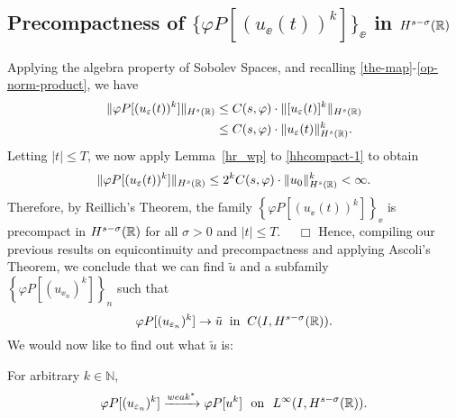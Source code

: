 \subsection{Precompactness of $\{\varphi P [(u_\ee(t))^k]\}_\ee$ in
$H^{s-\sigma  }(\mathbb{R})$}
Applying the algebra property of Sobolev
Spaces, and recalling \eqref{the-map}-\eqref{op-norm-product}, we have
\begin{equation}
\begin{split}
\label{hhcompact-1}
\|\varphi P [(u_\varepsilon(t))^k]\|_{H^{s}(\mathbb{R})}
& \le  C(s, \varphi) \cdot \|[u_\varepsilon(t)]^k\|_{H^{s}(\mathbb{R})}
\\
& \le C(s, \varphi) \cdot \|u_\varepsilon(t)\|^k_{H^{s}(\mathbb{R})}.
\end{split}
\end{equation}
%
Letting $|t| \le T$, we now apply Lemma~\ref{hr_wp} to
\eqref{hhcompact-1} to obtain
\begin{equation*}
\begin{split}
\|\varphi P [(u_\varepsilon(t))^k]\|_{H^{s}(\mathbb{R})}
\le 2^k C(s, \varphi) \cdot  \|u_0 \|^k_{H^s(\mathbb{R})} < \infty.
\end{split}
\end{equation*}
Therefore, by Reillich's Theorem, the family $\left\{
\varphi P [(u_\ee(t))^k] \right\}_\ee$ is
precompact in $H^{s- \sigma }(\mathbb{R})$ for all $\sigma > 0$ and $|t| \le T$. $\quad
\Box$ 
Hence, compiling our previous results on equicontinuity and precompactness
and applying Ascoli's Theorem, we
conclude that we can find $\tilde{u}$ and a subfamily 
\\ $\left\{
\varphi P [(u_{\ee_n})^k]
\right\}_n$ such that
\begin{equation}
\label{hhstrong-conv-of-u_ep}
\varphi P [(u_{\varepsilon_n})^k] \to \tilde{u}
\; \; \text{in} \; \; C(I, H^{s-\sigma}(\mathbb{R})).
\end{equation}
%
%
We would now like to find out what $\tilde{u}$ is:
%
%
%
\begin{lemma}
\label{hhlem:crit-conv}
For arbitrary $k \in \mathbb{N}$,
\begin{equation}
\begin{split}
\varphi P [(u_{\varepsilon_n})^k] \xrightarrow{weak^*}
\varphi P [u^k] \ \ \text{on} \ \ L^\infty(I,
H^{s-\sigma}(\mathbb{R})).
\label{hhcrit-conv-est}
\end{split}
\end{equation}
\end{lemma}
